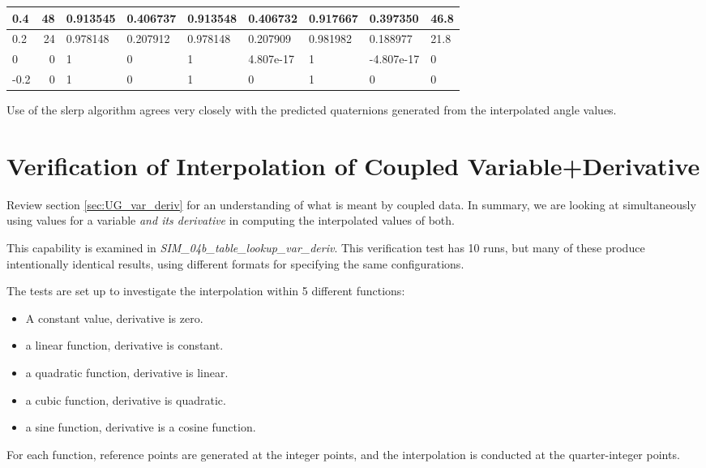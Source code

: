 \documentclass[11pt,fleqn]{report}
\begin{document}
\begin{table}
\begin{center}
\begin{tabular}{||l||r||l|l||l|l||l|l|l||}
 0.4  &  48 &
 0.913545 & 0.406737 &
 0.913548 & 0.406732 &
 0.917667 & 0.397350 & 46.8 \\ \hline

 0.2  &  24 &
 0.978148 & 0.207912 &
 0.978148 & 0.207909 &
 0.981982 & 0.188977 & 21.8 \\ \hline

 0    &   0 &
 1        &  0            &
 1        &  4.807e-17 &
 1        & -4.807e-17 &  0   \\ \hline

-0.2  &   0 &
 1        & 0       &
 1        & 0       &
 1        & 0       &  0   \\ \hline

\end{tabular}
\end{center}
\end{table}

Use of the slerp algorithm agrees very closely with the predicted
quaternions generated from the interpolated angle values.


\section{Verification of Interpolation of Coupled Variable+Derivative}
Review section \ref{sec:UG_var_deriv} for an understanding of what is meant
by coupled data. In summary, we are looking at simultaneously using values
for a variable \textit{and its derivative} in computing the interpolated
values of both.

This capability is examined in \textit{SIM\_04b\_table\_lookup\_var\_deriv}.
This verification test has 10 runs, but many of these produce intentionally
identical results, using different formats for specifying the same
configurations.

The tests are set up to investigate the interpolation within 5 different
functions:
\begin{itemize}
  \item A constant value, derivative is zero.
  \item a linear function, derivative is constant.
  \item a quadratic function, derivative is linear.
  \item a cubic function, derivative is quadratic.
  \item a sine function, derivative is a cosine function.
\end{itemize}
For each function, reference points are generated at the integer points, and
the interpolation is conducted at the quarter-integer points.
\end{document}
